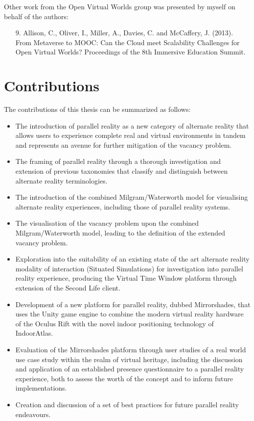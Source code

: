 
Other work from the Open Virtual Worlds group was presented by myself on behalf of the authors:

\begin{itemize}
	
	\item [9.] Allison, C., Oliver, I., Miller, A., Davies, C. and McCaffery, J. (2013). From Metaverse to MOOC: Can the Cloud meet Scalability Challenges for Open Virtual Worlds? Proceedings of the 8th Immersive Education Summit.
	
\end{itemize}



\section{Contributions}
\label{intro-contributions}
The contributions of this thesis can be summarized as follows:

\begin{itemize}
	\item The introduction of parallel reality as a new category of alternate reality that allows users to experience complete real and virtual environments in tandem and represents an avenue for further mitigation of the vacancy problem.
	\item The framing of parallel reality through a thorough investigation and extension of previous taxonomies that classify and distinguish between alternate reality terminologies.
	\item The introduction of the combined Milgram/Waterworth model for visualising alternate reality experiences, including those of parallel reality systems.
	\item The visualisation of the vacancy problem upon the combined Milgram/Waterworth model, leading to the definition of the extended vacancy problem.
	\item Exploration into the suitability of an existing state of the art alternate reality modality of interaction (Situated Simulations) for investigation into parallel reality experience, producing the Virtual Time Window platform through extension of the Second Life client.
	\item Development of a new platform for parallel reality, dubbed Mirrorshades, that uses the Unity game engine to combine the modern virtual reality hardware of the Oculus Rift with the novel indoor positioning technology of IndoorAtlas.
	\item Evaluation of the Mirrorshades platform through user studies of a real world use case study within the realm of virtual heritage, including the discussion and application of an established presence questionnaire to a parallel reality experience, both to assess the worth of the concept and to inform future implementations.
	\item Creation and discussion of a set of best practices for future parallel reality endeavours.
\end{itemize}

